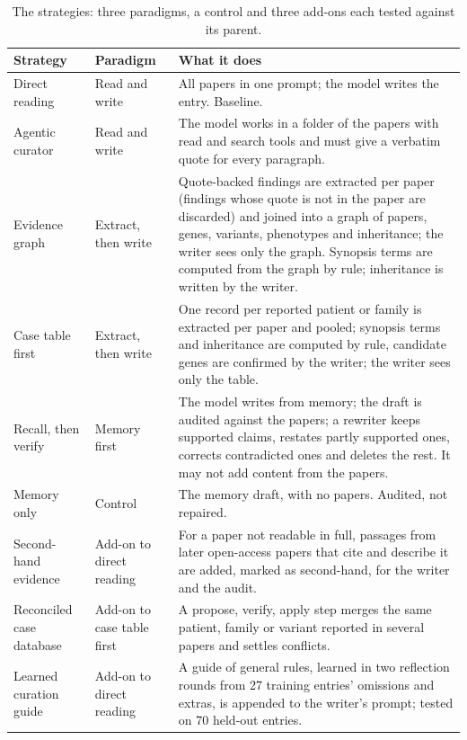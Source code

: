 \documentclass{article} %
\begin{document}
\begin{table}[!htbp]
\caption{The strategies: three paradigms, a control and three add-ons each tested against its parent.}
\label{tab:app_strategies}
\scriptsize
\begin{tabularx}{\linewidth}{>{\raggedright\arraybackslash}p{2.4cm}>{\centering\arraybackslash}X>{\centering\arraybackslash}X}
\toprule
Strategy & Paradigm & What it does \\
\midrule
Direct reading & Read and write & All papers in one prompt; the model writes the entry. Baseline. \\
Agentic curator & Read and write & The model works in a folder of the papers with read and search tools and must give a verbatim quote for every paragraph. \\
Evidence graph & Extract, then write & Quote-backed findings are extracted per paper (findings whose quote is not in the paper are discarded) and joined into a graph of papers, genes, variants, phenotypes and inheritance; the writer sees only the graph. Synopsis terms are computed from the graph by rule; inheritance is written by the writer. \\
Case table first & Extract, then write & One record per reported patient or family is extracted per paper and pooled; synopsis terms and inheritance are computed by rule, candidate genes are confirmed by the writer; the writer sees only the table. \\
Recall, then verify & Memory first & The model writes from memory; the draft is audited against the papers; a rewriter keeps supported claims, restates partly supported ones, corrects contradicted ones and deletes the rest. It may not add content from the papers. \\
Memory only & Control & The memory draft, with no papers. Audited, not repaired. \\
Second-hand evidence & Add-on to direct reading & For a paper not readable in full, passages from later open-access papers that cite and describe it are added, marked as second-hand, for the writer and the audit. \\
Reconciled case database & Add-on to case table first & A propose, verify, apply step merges the same patient, family or variant reported in several papers and settles conflicts. \\
Learned curation guide & Add-on to direct reading & A guide of general rules, learned in two reflection rounds from 27 training entries' omissions and extras, is appended to the writer's prompt; tested on 70 held-out entries. \\
\bottomrule
\end{tabularx}
\end{table}
\end{document}
